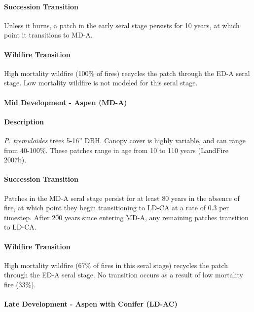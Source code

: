 \paragraph{Succession Transition} Unless it burns, a patch in the early seral stage persists for 10 years, at which point it transitions to MD-A.

\paragraph{Wildfire Transition} High mortality wildfire (100\% of fires) recycles the patch through the ED-A seral stage. Low mortality wildfire is not modeled for this seral stage.

\noindent\hrulefill


\paragraph{Mid Development - Aspen (MD-A)}

\paragraph{Description} \emph{P. tremuloides} trees 5-16'' DBH. Canopy cover is highly variable, and can range from 40-100\%. These patches range in age from 10 to 110 years (LandFire 2007b).

\paragraph{Succession Transition} Patches in the MD-A seral stage persist for at least 80 years in the absence of fire, at which point they begin transitioning to LD-CA at a rate of 0.3 per timestep. After 200 years since entering MD-A, any remaining patches transition to LD-CA. 

\paragraph{Wildfire Transition} High mortality wildfire (67\% of fires in this seral stage) recycles the patch through the ED-A seral stage. No transition occurs as a result of low mortality fire (33\%).

\noindent\hrulefill



\paragraph{Late Development - Aspen with Conifer (LD-AC)}

